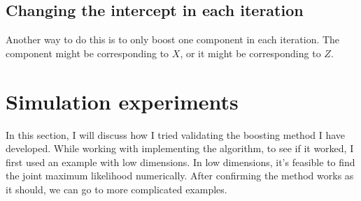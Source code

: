 \subsection{Changing the intercept in each iteration}
Another way to do this is to only boost one component in each iteration. The component might be corresponding to $X$, or it might be corresponding to $Z$.


\section{Simulation experiments}
In this section, I will discuss how I tried validating the boosting method I have developed. While working with implementing the algorithm, to see if it worked, I first used an example with low dimensions. In low dimensions, it's feasible to find the joint maximum likelihood numerically. After confirming the method works as it should, we can go to more complicated examples.

